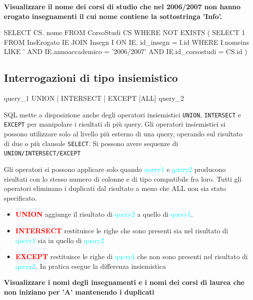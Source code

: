 \textbf{\large Visualizzare il nome dei corsi di studio che nel 2006/2007 non
hanno 
erogato insegnamenti il cui nome contiene la sottostringa ’Info’.}


\begin{codiceSQL}
  SELECT CS. nome FROM CorsoStudi CS
WHERE NOT EXISTS (
  SELECT 1 
  FROM InsErogato IE 
    JOIN Insegn I ON IE. id_insegn = I.id
  WHERE I.nomeins LIKE '%
  AND IE.annoaccademico = '2006/2007'
  AND IE.id_corsostudi = CS.id
)
\end{codiceSQL}



\subsection*{Interrogazioni di tipo insiemistico}

\begin{codiceSQL}
  query_1 { UNION | INTERSECT | EXCEPT } [ALL] query_2
\end{codiceSQL}

SQL mette a disposizione anche degli operatori insiemistici \texttt{UNION}, \texttt{INTERSECT} e 
\texttt{EXCEPT} per manipolare i risultati di più query.
Gli operatori insiemistici si possono utilizzare solo al livello più esterno di una 
query, operando sul risultato di due o più clausole \texttt{SELECT}.
Si possono avere sequenze di \texttt{UNION/INTERSECT/EXCEPT}


Gli operatori si possono applicare solo quando \textcolor{cyan}{query1} e \textcolor{cyan}{query2} producono 
risultati con lo stesso numero di colonne e di tipo compatibile fra loro.
Tutti gli operatori eliminano i duplicati dal risultato a meno che ALL non sia 
stato specificato.
\begin{itemize}
  \item \textcolor{red}{\textbf{UNION}} aggiunge il risultato di \textcolor{cyan}{query2} a quello di \textcolor{cyan}{query1}.
  \item \textcolor{red}{\textbf{INTERSECT}} restituisce le righe che sono presenti sia nel risultato di \textcolor{cyan}{query1} sia in quello di \textcolor{cyan}{query2}
  \item \textcolor{red}{\textbf{EXCEPT}} restituisce le righe di \textcolor{cyan}{query1} che non sono presenti nel risultato di \textcolor{cyan}{query2}. In pratica esegue la differenza insiemistica


\end{itemize}


\textbf{\large Visualizzare i nomi degli insegnamenti e i nomi dei corsi di laurea 
che non iniziano per 'A' mantenendo i duplicati}

